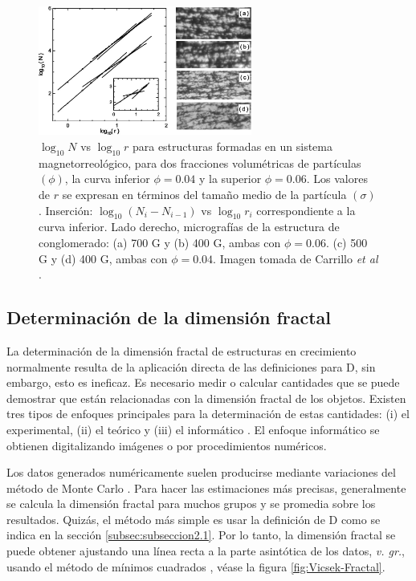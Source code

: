 \documentclass[11pt]{article}
\begin{document}
\begin{figure}[h!]
\vspace{1cm}
\centering
{\includegraphics[width=7cm]{Carrillo2006} \par}
\caption{ $\log_{10}N$ vs $\log_{10}r$ para estructuras formadas en un sistema magnetorreológico, para dos fracciones volumétricas de partículas $(\phi)$, la curva inferior $\phi = 0.04$ y la superior $\phi = 0.06$. Los valores de $r$ se expresan en términos del tamaño medio de la partícula $(\sigma)$. Inserción: $\log_{10}(N_i - N_{i-1})$ vs $\log_{10} r_i$ correspondiente a la curva inferior. Lado derecho, micrografías de la estructura de conglomerado: (a) 700 G y (b) 400 G, ambas con $\phi = 0.06$. (c) 500 G y (d) 400 G, ambas con $\phi = 0.04$. Imagen tomada de Carrillo \textit{et al} \cite{Carrillo2003}.}
\label{fig:Carrillo2003}
\end{figure}
 
\clearpage  
\subsection{Determinaci\'{o}n de la dimensi\'{o}n fractal}
\label{subsec:subseccion2.3}


La determinaci\'{o}n de la dimensi\'{o}n fractal de estructuras en crecimiento normalmente resulta de la aplicaci\'{o}n directa de las definiciones para D, sin embargo, esto es ineficaz. Es necesario medir o calcular cantidades que se puede demostrar que est\'{a}n relacionadas con la dimensi\'{o}n fractal de los objetos. Existen  tres tipos de enfoques principales para la determinaci\'{o}n de estas cantidades: (i) el experimental, (ii) el te\'{o}rico y (iii) el inform\'{a}tico \cite{Vicsek1992}. El enfoque inform\'{a}tico se obtienen digitalizando im\'{a}genes o por procedimientos num\'{e}ricos.
 
Los datos generados num\'{e}ricamente suelen producirse mediante variaciones del m\'{e}todo de Monte Carlo \cite{Mustafa1996}. Para hacer las estimaciones m\'{a}s precisas, generalmente se calcula la dimensi\'{o}n fractal para muchos grupos y se promedia sobre los resultados. Quiz\'{a}s, el m\'{e}todo m\'{a}s simple es usar la definici\'{o}n de  D como se indica en la secci\'{o}n \ref{subsec:subseccion2.1}. Por lo tanto, la dimensi\'{o}n fractal se puede obtener ajustando una l\'{i}nea recta a la parte asint\'{o}tica de los datos, \textit{v. gr.}, usando el m\'{e}todo de m\'{i}nimos cuadrados \cite{Vicsek1992}, v\'{e}ase la figura \ref{fig:Vicsek-Fractal}.
\end{document}
